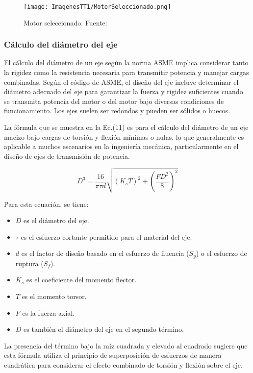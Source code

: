 \documentclass[14pt,oneside]{extarticle} %
\begin{document}
\begin{figure}[H]
    \centering
    \texttt{[image: ImagenesTT1/MotorSeleccionado.png]}
    \caption{Motor seleccionado. Fuente: \cite{SeleccionMotor}}
    \label{fig:Motor}
\end{figure}

\subsubsection{Cálculo del diámetro del eje}

El cálculo del diámetro de un eje según la norma ASME implica considerar tanto la rigidez como la resistencia necesaria para transmitir potencia y manejar cargas combinadas. Según el código de ASME, el diseño del eje incluye determinar el diámetro adecuado del eje para garantizar la fuerza y rigidez suficientes cuando se transmita potencia del motor o del motor bajo diversas condiciones de funcionamiento. Los ejes suelen ser redondos y pueden ser sólidos o huecos.

La fórmula que se muestra en la Ec.(11) es para el cálculo del diámetro de un eje macizo bajo cargas de torsión y flexión mínimas o nulas, lo que generalmente es aplicable a muchos escenarios en la ingeniería mecánica, particularmente en el diseño de ejes de transmisión de potencia.

\begin{equation}
D^3 = \frac{16}{\pi \tau d} \sqrt{(K_sT)^2 + \left(\frac{FD^2}{8}\right)^2}
\end{equation}

Para esta ecuación, se tiene:
\begin{itemize}
    \item $D$ es el diámetro del eje.
    \item $\tau$ es el esfuerzo cortante permitido para el material del eje.
    \item $d$ es el factor de diseño basado en el esfuerzo de fluencia ($S_y$) o el esfuerzo de ruptura ($S_f$).
    \item $K_s$ es el coeficiente del momento flector.
    \item $T$ es el momento torsor.
    \item $F$ es la fuerza axial.
    \item $D$ es también el diámetro del eje en el segundo término.
\end{itemize}

La presencia del término bajo la raíz cuadrada y elevado al cuadrado sugiere que esta fórmula utiliza el principio de superposición de esfuerzos de manera cuadrática para considerar el efecto combinado de torsión y flexión sobre el eje.
\end{document}
